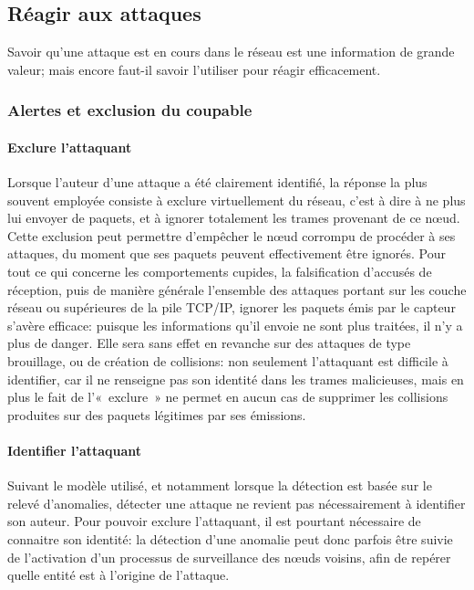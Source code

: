 \subsection{Réagir aux attaques}
Savoir qu'une attaque est en cours dans le réseau est une information de grande valeur; mais encore faut-il savoir l'utiliser pour réagir efficacement.

    \subsubsection{Alertes et exclusion du coupable}
        \paragraph{Exclure l'attaquant}
Lorsque l'auteur d'une attaque a été clairement identifié, la réponse la plus souvent employée consiste à exclure virtuellement du réseau, c'est à dire à ne plus lui envoyer de paquets, et à ignorer totalement les trames provenant de ce nœud.
Cette exclusion peut permettre d'empêcher le nœud corrompu de procéder à ses attaques, du moment que ses paquets peuvent effectivement être ignorés.
Pour tout ce qui concerne les comportements cupides, la falsification d'accusés de réception, puis de manière générale l'ensemble des attaques portant sur les couche réseau ou supérieures de la pile TCP/IP, ignorer les paquets émis par le capteur s'avère efficace: puisque les informations qu'il envoie ne sont plus traitées, il n'y a plus de danger.
Elle sera sans effet en revanche sur des attaques de type brouillage, ou de création de collisions: non seulement l'attaquant est difficile à identifier, car il ne renseigne pas son identité dans les trames malicieuses, mais en plus le fait de l'« exclure » ne permet en aucun cas de supprimer les collisions produites sur des paquets légitimes par ses émissions.

        \paragraph{Identifier l'attaquant}
Suivant le modèle utilisé, et notamment lorsque la détection est basée sur le relevé d'anomalies, détecter une attaque ne revient pas nécessairement à identifier son auteur.
Pour pouvoir exclure l'attaquant, il est pourtant nécessaire de connaitre son identité: la détection d'une anomalie peut donc parfois être suivie de l'activation d'un processus de surveillance des nœuds voisins, afin de repérer quelle entité est à l'origine de l'attaque.

